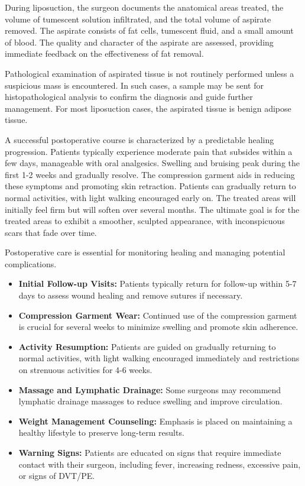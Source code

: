 During liposuction, the surgeon documents the anatomical areas treated, the volume of tumescent solution infiltrated, and the total volume of aspirate removed. The aspirate consists of fat cells, tumescent fluid, and a small amount of blood. The quality and character of the aspirate are assessed, providing immediate feedback on the effectiveness of fat removal.

Pathological examination of aspirated tissue is not routinely performed unless a suspicious mass is encountered. In such cases, a sample may be sent for histopathological analysis to confirm the diagnosis and guide further management. For most liposuction cases, the aspirated tissue is benign adipose tissue.

A successful postoperative course is characterized by a predictable healing progression. Patients typically experience moderate pain that subsides within a few days, manageable with oral analgesics. Swelling and bruising peak during the first 1-2 weeks and gradually resolve. The compression garment aids in reducing these symptoms and promoting skin retraction. Patients can gradually return to normal activities, with light walking encouraged early on. The treated areas will initially feel firm but will soften over several months. The ultimate goal is for the treated areas to exhibit a smoother, sculpted appearance, with inconspicuous scars that fade over time.

Postoperative care is essential for monitoring healing and managing potential complications. 

\begin{itemize}
  \item \textbf{Initial Follow-up Visits:} Patients typically return for follow-up within 5-7 days to assess wound healing and remove sutures if necessary.

  \item \textbf{Compression Garment Wear:} Continued use of the compression garment is crucial for several weeks to minimize swelling and promote skin adherence.

  \item \textbf{Activity Resumption:} Patients are guided on gradually returning to normal activities, with light walking encouraged immediately and restrictions on strenuous activities for 4-6 weeks.

  \item \textbf{Massage and Lymphatic Drainage:} Some surgeons may recommend lymphatic drainage massages to reduce swelling and improve circulation.

  \item \textbf{Weight Management Counseling:} Emphasis is placed on maintaining a healthy lifestyle to preserve long-term results.

  \item \textbf{Warning Signs:} Patients are educated on signs that require immediate contact with their surgeon, including fever, increasing redness, excessive pain, or signs of DVT/PE.
\end{itemize}

